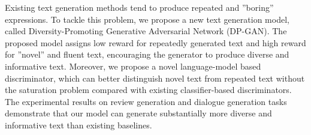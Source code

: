 Existing text generation methods tend to produce repeated and ''boring'' expressions. To tackle this problem, we propose a new text generation model, called Diversity-Promoting Generative Adversarial Network (DP-GAN). The proposed model assigns low reward for repeatedly generated text and high reward for ''novel'' and fluent text, encouraging the generator to produce diverse and informative text. Moreover, we propose a novel language-model based discriminator, which can better distinguish novel text from repeated text without the saturation problem compared with existing classifier-based discriminators. The experimental results on review generation and dialogue generation tasks demonstrate that our model can generate substantially more diverse and informative text than existing baselines.
